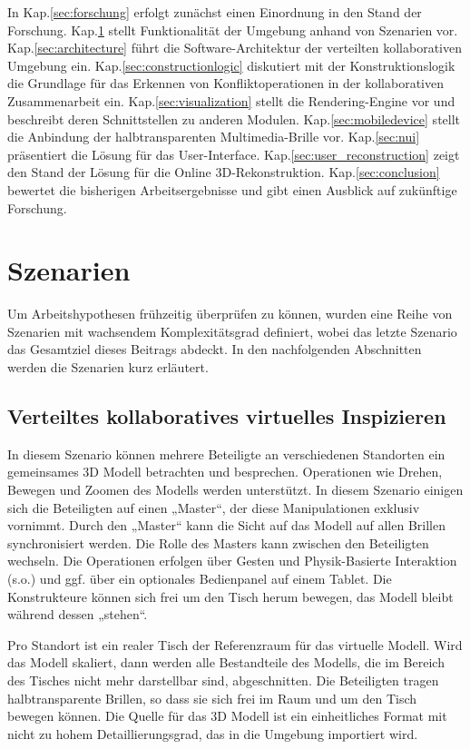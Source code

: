 In Kap.\ref{sec:forschung} erfolgt zunächst einen Einordnung in den Stand der Forschung.  Kap.\ref{sec:method} stellt Funktionalität der Umgebung anhand von Szenarien vor. Kap.\ref{sec:architecture}
führt die Software-Architektur der verteilten kollaborativen Umgebung ein. Kap.\ref{sec:constructionlogic} diskutiert mit der Konstruktionslogik die Grundlage für das Erkennen von Konfliktoperationen in der kollaborativen Zusammenarbeit ein. Kap.\ref{sec:visualization} stellt die Rendering-Engine vor und beschreibt deren Schnittstellen zu anderen Modulen. Kap.\ref{sec:mobiledevice} stellt die Anbindung der halbtransparenten Multimedia-Brille vor. Kap.\ref{sec:nui} präsentiert die Lösung für das User-Interface. Kap.\ref{sec:user_reconstruction} zeigt den Stand der Lösung für die Online 3D-Rekonstruktion. Kap.\ref{sec:conclusion} bewertet die bisherigen Arbeitsergebnisse und gibt einen Ausblick auf zukünftige Forschung.

\section{Szenarien} \label{sec:method}

Um Arbeitshypothesen frühzeitig überprüfen zu können, wurden eine Reihe von Szenarien mit wachsendem Komplexitätsgrad definiert, wobei das letzte Szenario das Gesamtziel dieses Beitrags abdeckt. In den nachfolgenden Abschnitten werden die Szenarien kurz erläutert.

\subsection{Verteiltes kollaboratives virtuelles Inspizieren}

In diesem Szenario können mehrere Beteiligte an verschiedenen Standorten ein gemeinsames 3D Modell betrachten und besprechen. Operationen wie Drehen, Bewegen und Zoomen des Modells werden unterstützt.  In diesem Szenario einigen sich die Beteiligten auf einen „Master“, der diese Manipulationen exklusiv vornimmt. Durch den „Master“ kann die Sicht auf das Modell auf allen Brillen synchronisiert werden. Die Rolle des Masters kann zwischen den Beteiligten wechseln. Die Operationen erfolgen über Gesten und Physik-Basierte Interaktion (s.o.) und ggf. über ein optionales Bedienpanel auf einem Tablet. Die Konstrukteure können sich frei um den Tisch herum bewegen, das Modell bleibt während dessen „stehen“.

Pro Standort ist ein realer Tisch der Referenzraum für das virtuelle Modell. Wird das Modell skaliert, dann werden alle Bestandteile des Modells, die im Bereich des Tisches nicht mehr darstellbar sind, abgeschnitten. Die Beteiligten tragen halbtransparente Brillen, so dass sie sich frei im Raum und um den Tisch bewegen können. Die Quelle für das 3D Modell ist ein einheitliches Format mit nicht zu hohem Detaillierungsgrad, das in die Umgebung importiert wird.

